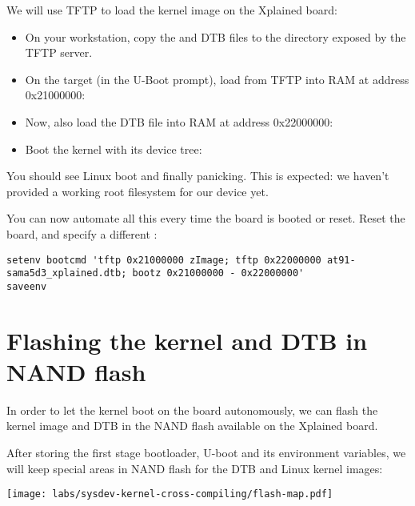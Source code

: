 We will use TFTP to load the kernel image on the Xplained board:

\begin{itemize}

\item On your workstation, copy the  and DTB files to the
  directory exposed by the TFTP server.

\item On the target (in the U-Boot prompt), load  from
  TFTP into RAM at address 0x21000000:\\

\item Now, also load the DTB file into RAM at address 0x22000000:\\

\item Boot the kernel with its device tree:\\

\end{itemize}

You should see Linux boot and finally panicking. This is expected: we
haven't provided a working root filesystem for our device yet.

You can now automate all this every time the board is booted or
reset. Reset the board, and specify a different :

{\scriptsize
\begin{verbatim}
setenv bootcmd 'tftp 0x21000000 zImage; tftp 0x22000000 at91-sama5d3_xplained.dtb; bootz 0x21000000 - 0x22000000'
saveenv
\end{verbatim}
}

\section{Flashing the kernel and DTB in NAND flash}

In order to let the kernel boot on the board autonomously, we can
flash the kernel image and DTB in the NAND flash available on the
Xplained board.

After storing the first stage bootloader, U-boot and its environment
variables, we will keep special areas in NAND flash for the DTB
and Linux kernel images:

\begin{center}
  \texttt{[image: labs/sysdev-kernel-cross-compiling/flash-map.pdf]}
\end{center}

